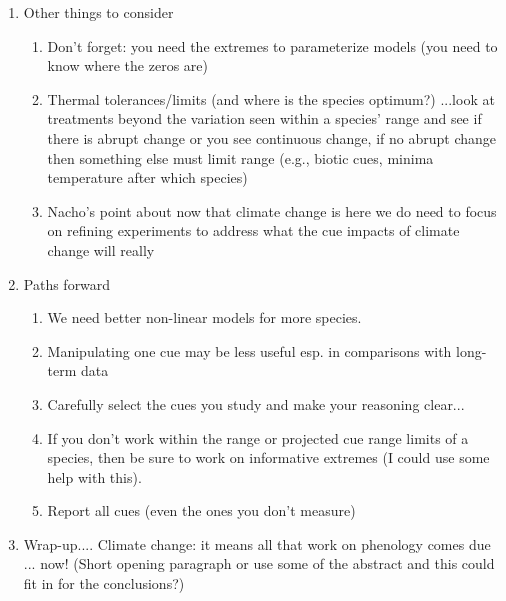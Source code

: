 \documentclass[11pt,letterpaper]{article}
\begin{document}
\begin{enumerate}
\begin{enumerate}
\begin{enumerate}
\begin{enumerate}
\item Min daily temp for 1-2 months before leafout (Nacho's figures)
\item Max daily temp for 1-2 months before leafout (Nacho's figures) \footnote{We used daily min/max, as they're most directly comparable to OSPREE.}
\item Add potential PhenoFit figure here? 3D of all three cues and how they shifted?
\end{enumerate}
\end{enumerate}
\item Other things to consider
\begin{enumerate}
\item Don't forget: you need the extremes to parameterize models (you need to know where the zeros are)
\item Thermal tolerances/limits (and where is the species optimum?) ...look at treatments beyond the variation seen within a species' range and see if there is abrupt change or you see continuous change, if no abrupt change then something else must limit range (e.g., biotic cues, minima temperature after which species)
\item Nacho's point about now that climate change is here we do need to focus on refining experiments to address what the cue impacts of climate change will really
\end{enumerate}
\item Paths forward
\begin{enumerate}
\item We need better non-linear models for more species.
\item Manipulating one cue may be less useful esp. in comparisons with long-term data
\item Carefully select the cues you study and make your reasoning clear...
\item If you don't work within the range or projected cue range limits of a species, then be sure to work on informative extremes (I could use some help with this). 
\item Report all cues (even the ones you don't measure)
\end{enumerate}
\item Wrap-up.... Climate change: it means all that work on phenology comes due ... now! (Short opening paragraph or use some of the abstract and this could fit in for the conclusions?)
\end{enumerate}
\end{enumerate}
\end{document}
